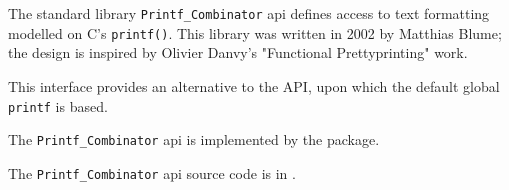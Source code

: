 
The standard library {\tt Printf\_Combinator} api defines access to text formatting 
modelled on C's {\tt printf()}.  This library was written in 2002 by Matthias Blume; 
the design is inspired by Olivier Danvy's "Functional Prettyprinting" work.

This interface provides an alternative to the  
 API, upon which the 
default global {\tt printf} is based.

The {\tt Printf\_Combinator} api is implemented by the  package.

The {\tt Printf\_Combinator} api source code is in .

